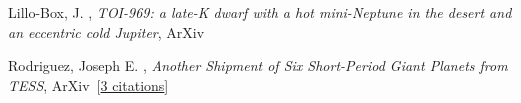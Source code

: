 \item[{\color{numcolor}\scriptsize2}] Lillo-Box, J. , \emph{TOI-969: a late-K dwarf with a hot mini-Neptune in the desert and an eccentric cold Jupiter}, ArXiv\ 

\item[{\color{numcolor}\scriptsize1}] Rodriguez, Joseph E. , \emph{Another Shipment of Six Short-Period Giant Planets from TESS}, ArXiv\  [\href{https://ui.adsabs.harvard.edu/abs/2022arXiv220505709R}{3 citations}]